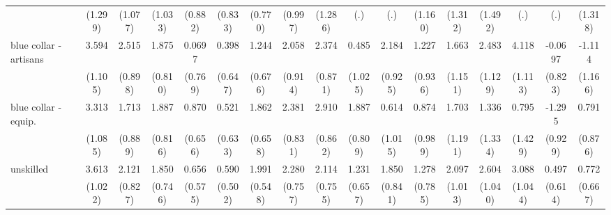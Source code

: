{\begin{tabular}{l*{16}{c}}
                    &     (1.299)         &     (1.077)         &     (1.033)         &     (0.882)         &     (0.833)         &     (0.770)         &     (0.997)         &     (1.286)         &         (.)         &         (.)         &     (1.160)         &     (1.312)         &     (1.492)         &         (.)         &         (.)         &     (1.318)         \\
[1em]
blue collar - artisans&       3.594\sym{**} &       2.515\sym{**} &       1.875\sym{*}  &      0.0697         &       0.398         &       1.244         &       2.058\sym{*}  &       2.374\sym{**} &       0.485         &       2.184\sym{*}  &       1.227         &       1.663         &       2.483\sym{*}  &       4.118\sym{***}&     -0.0697         &      -1.114         \\
                    &     (1.105)         &     (0.898)         &     (0.810)         &     (0.769)         &     (0.647)         &     (0.676)         &     (0.914)         &     (0.871)         &     (1.025)         &     (0.925)         &     (0.936)         &     (1.151)         &     (1.129)         &     (1.113)         &     (0.823)         &     (1.166)         \\
[1em]
blue collar - equip.&       3.313\sym{**} &       1.713         &       1.887\sym{*}  &       0.870         &       0.521         &       1.862\sym{**} &       2.381\sym{**} &       2.910\sym{***}&       1.887\sym{*}  &       0.614         &       0.874         &       1.703         &       1.336         &       0.795         &      -1.295         &       0.791         \\
                    &     (1.085)         &     (0.889)         &     (0.816)         &     (0.656)         &     (0.633)         &     (0.658)         &     (0.831)         &     (0.862)         &     (0.809)         &     (1.015)         &     (0.989)         &     (1.191)         &     (1.334)         &     (1.429)         &     (0.929)         &     (0.876)         \\
[1em]
unskilled           &       3.613\sym{***}&       2.121\sym{*}  &       1.850\sym{*}  &       0.656         &       0.590         &       1.991\sym{***}&       2.280\sym{**} &       2.114\sym{**} &       1.231         &       1.850\sym{*}  &       1.278         &       2.097\sym{*}  &       2.604\sym{*}  &       3.088\sym{**} &       0.497         &       0.772         \\
                    &     (1.022)         &     (0.827)         &     (0.746)         &     (0.575)         &     (0.502)         &     (0.548)         &     (0.757)         &     (0.755)         &     (0.657)         &     (0.841)         &     (0.785)         &     (1.013)         &     (1.040)         &     (1.044)         &     (0.614)         &     (0.667)         \\

\end{tabular}}
